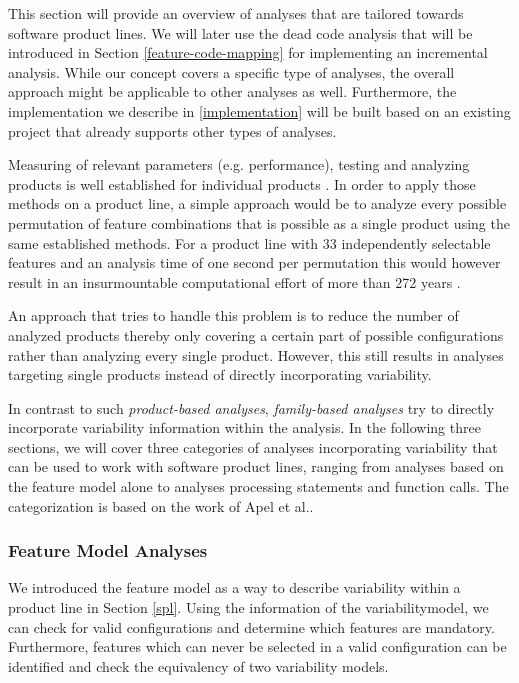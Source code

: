 \documentclass[a4paper]{article}
\begin{document}
This section will provide an overview of analyses that are tailored towards software product lines. We will later use the dead code analysis that will be introduced in Section \ref{feature-code-mapping}  for implementing an incremental analysis. While our concept covers a specific type of analyses, the overall approach might be applicable to other analyses as well. Furthermore, the implementation we describe in \autoref{implementation} will be built based on an existing project that already supports other types of analyses. 

Measuring of relevant parameters (e.g. performance), testing and analyzing products is well established for individual products \cite[p.243]{Apel:2013:FSP:2541773}. 
In order to apply those methods on a product line, a simple approach would be to analyze every possible permutation of feature combinations that is possible as a single product using the same established methods. For a product line with 33 independently selectable features and an analysis time of one second per permutation this would however result in an insurmountable computational effort of more than 272 years \cite{Thum:2014:CSA:2620784.2580950}. 

An approach that tries to handle this problem is to reduce the number of analyzed products thereby only covering a certain part of possible configurations rather than analyzing every single product. However, this still results in analyses targeting single products instead of directly incorporating variability. 

In contrast to such \emph{product-based analyses}, \emph{family-based analyses} try to directly incorporate variability information within the analysis. In the following three sections, we will cover three categories of analyses incorporating variability that can be used to work with software product lines, ranging from analyses based on the feature model alone  to analyses processing statements and function calls. The categorization is based on the work of Apel et al.\cite{Apel:2013:FSP:2541773}.

\subsubsection{Feature Model Analyses}

We introduced the feature model as a way to describe variability within a product line in Section \ref{spl}. Using the information of the variabilitymodel, we can check for valid configurations and determine which features are mandatory.
Furthermore, features which can never be selected in a valid configuration can be identified and check the equivalency of two variability models.
\end{document}
